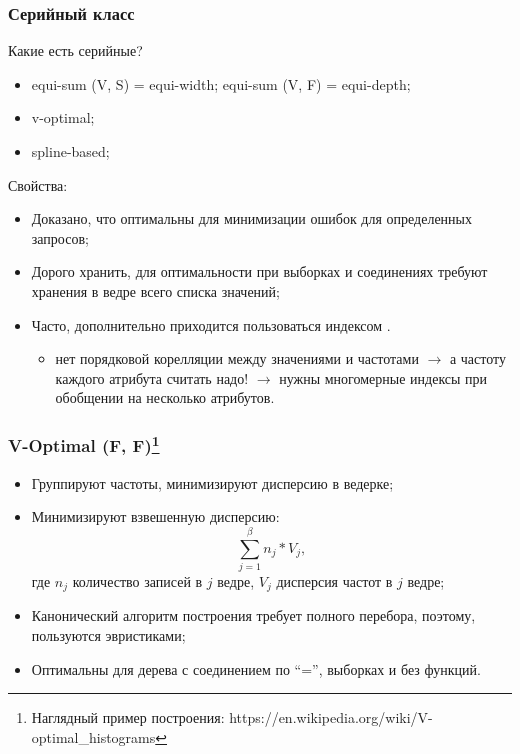 \documentclass{beamer}
\begin{document}
\begin{frame}
\frametitle{Серийный класс}

Какие есть серийные?
\begin{itemize}
  \setlength\itemsep{1em}
  \item equi-sum (V, S) = equi-width; equi-sum (V, F) = equi-depth;
  \item v-optimal;  
  \item spline-based;
\end{itemize}

Свойства:
\begin{itemize}
  \item Доказано, что оптимальны для минимизации ошибок для определенных запросов;
  \item Дорого хранить, для оптимальности при выборках и соединениях требуют хранения в ведре всего списка значений;
  \item Часто, дополнительно приходится пользоваться индексом \cite{Ioannidis1995}.
  \begin{itemize}
    \item[] нет порядковой корелляции между значениями и частотами $\longrightarrow$ а частоту каждого атрибута считать надо! $\longrightarrow$ нужны многомерные индексы при обобщении на несколько атрибутов.
  \end{itemize}

\end{itemize}

\end{frame}


\begin{frame}
\frametitle{V-Optimal (F, F)\footnote{Наглядный пример построения: https://en.wikipedia.org/wiki/V-optimal\_histograms}}

\begin{itemize}
  \setlength\itemsep{1em}
  \item Группируют частоты, минимизируют дисперсию в ведерке;
  \item Минимизируют взвешенную дисперсию:
  $$\sum\limits_{j=1}^{\beta} n_j * V_j, $$
  где  $n_j$ количество записей в $j$ ведре, $V_j$ дисперсия \alert{частот} в $j$ ведре;
  \item Канонический алгоритм построения требует полного перебора, поэтому, пользуются эвристиками;
  \item Оптимальны для дерева с соединением по ``='', выборках и без функций.
\end{itemize}

\end{frame}
\end{document}
